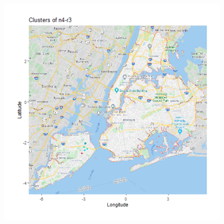 \documentclass{FR16}
\begin{document}
\begin{itemize}
\begin{figure}[!htb]
\begin{minipage}{0.33\textwidth}
   \end{minipage}
   \begin{minipage}{0.33\textwidth}
     \centering
     \includegraphics[width=1\linewidth]{figures/clust-n4-r3.png} 
   \end{minipage}\hfill
 


\end{figure}
\end{itemize}
\end{document}
